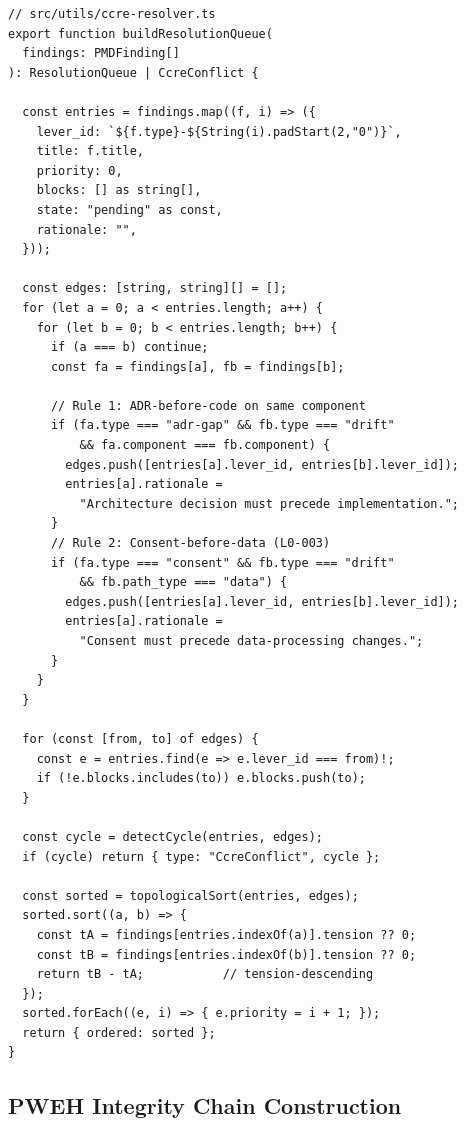 \documentclass[12pt,a4paper]{article}
\theoremstyle{definition}
\theoremstyle{plain}
\theoremstyle{remark}
\begin{document}
\begin{lstlisting}[style=tsstyle,
  caption={CCRE dependency DAG construction and topological sort},
  label={lst:ccre}]
// src/utils/ccre-resolver.ts
export function buildResolutionQueue(
  findings: PMDFinding[]
): ResolutionQueue | CcreConflict {

  const entries = findings.map((f, i) => ({
    lever_id: `${f.type}-${String(i).padStart(2,"0")}`,
    title: f.title,
    priority: 0,
    blocks: [] as string[],
    state: "pending" as const,
    rationale: "",
  }));

  const edges: [string, string][] = [];
  for (let a = 0; a < entries.length; a++) {
    for (let b = 0; b < entries.length; b++) {
      if (a === b) continue;
      const fa = findings[a], fb = findings[b];

      // Rule 1: ADR-before-code on same component
      if (fa.type === "adr-gap" && fb.type === "drift"
          && fa.component === fb.component) {
        edges.push([entries[a].lever_id, entries[b].lever_id]);
        entries[a].rationale =
          "Architecture decision must precede implementation.";
      }
      // Rule 2: Consent-before-data (L0-003)
      if (fa.type === "consent" && fb.type === "drift"
          && fb.path_type === "data") {
        edges.push([entries[a].lever_id, entries[b].lever_id]);
        entries[a].rationale =
          "Consent must precede data-processing changes.";
      }
    }
  }

  for (const [from, to] of edges) {
    const e = entries.find(e => e.lever_id === from)!;
    if (!e.blocks.includes(to)) e.blocks.push(to);
  }

  const cycle = detectCycle(entries, edges);
  if (cycle) return { type: "CcreConflict", cycle };

  const sorted = topologicalSort(entries, edges);
  sorted.sort((a, b) => {
    const tA = findings[entries.indexOf(a)].tension ?? 0;
    const tB = findings[entries.indexOf(b)].tension ?? 0;
    return tB - tA;           // tension-descending
  });
  sorted.forEach((e, i) => { e.priority = i + 1; });
  return { ordered: sorted };
}
\end{lstlisting}

\subsection{PWEH Integrity Chain Construction}
\end{document}
